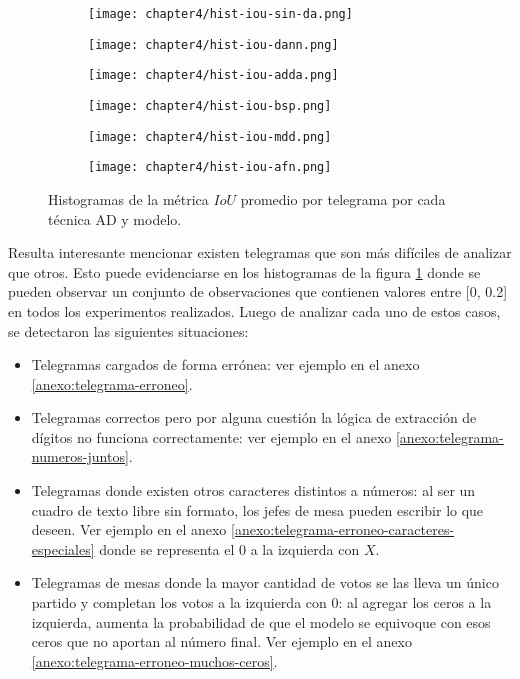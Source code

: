 \begin{figure}[H]
    \centering
    \begin{subfigure}[h]{0.40\textwidth}
        \texttt{[image: chapter4/hist-iou-sin-da.png]}
    \end{subfigure}
    \hfill
    \begin{subfigure}[h]{0.40\textwidth}
        \texttt{[image: chapter4/hist-iou-dann.png]}
    \end{subfigure}
    \hfill
    \begin{subfigure}[h]{0.40\textwidth}
        \texttt{[image: chapter4/hist-iou-adda.png]}
    \end{subfigure}
    \hfill
    \begin{subfigure}[h]{0.40\textwidth}
        \texttt{[image: chapter4/hist-iou-bsp.png]}
    \end{subfigure}
    \hfill
    \begin{subfigure}[h]{0.40\textwidth}
        \texttt{[image: chapter4/hist-iou-mdd.png]}
    \end{subfigure}
    \hfill
    \begin{subfigure}[h]{0.40\textwidth}
        \texttt{[image: chapter4/hist-iou-afn.png]}
    \end{subfigure}

    \caption{Histogramas de la métrica $IoU$ promedio por telegrama por cada técnica AD y modelo.}
    \label{fig:histogramas-ious}
\end{figure}

Resulta interesante mencionar existen telegramas que son más difíciles de analizar que otros. Esto puede evidenciarse
en los histogramas de la figura \ref{fig:histogramas-ious} donde se pueden observar un conjunto de observaciones que
contienen valores entre [0, 0.2] en todos los experimentos realizados. Luego de analizar cada uno de estos casos, se
detectaron las siguientes situaciones:

\begin{itemize}
    \item Telegramas cargados de forma errónea: ver ejemplo en el anexo \ref{anexo:telegrama-erroneo}.
    \item Telegramas correctos pero por alguna cuestión la lógica de extracción de dígitos no funciona correctamente: ver ejemplo
          en el anexo \ref{anexo:telegrama-numeros-juntos}.
    \item Telegramas donde existen otros caracteres distintos a números: al ser un cuadro de texto libre sin formato, los jefes
          de mesa pueden escribir lo que deseen. Ver ejemplo en el anexo \ref{anexo:telegrama-erroneo-caracteres-especiales}
          donde se representa el $0$ a la izquierda con $X$.
    \item Telegramas de mesas donde la mayor cantidad de votos se las lleva un único partido y completan los votos a la izquierda
          con $0$: al agregar los ceros a la izquierda, aumenta la probabilidad de que el modelo se equivoque con esos ceros que
          no aportan al número final. Ver ejemplo en el anexo \ref{anexo:telegrama-erroneo-muchos-ceros}.
\end{itemize}

